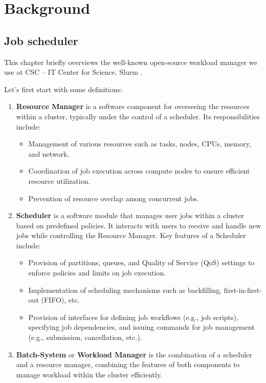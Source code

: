 \chapter{Background}
\label{chap:background}
\section{Job scheduler}
This chapter briefly overviews the well-known open-source workload manager we use at CSC -- IT Center for Science, Slurm \cite{10.1007/10968987_3}.

Let's first start with some definitions:

\begin{enumerate}
    \item \textbf{Resource Manager} is a software component for overseeing the resources within a cluster, typically under the control of a scheduler. Its responsibilities include:

    \begin{itemize}
        \item Management of various resources such as tasks, nodes, CPUs, memory, and network.
        \item Coordination of job execution across compute nodes to ensure efficient resource utilization.
        \item Prevention of resource overlap among concurrent jobs.
    \end{itemize}
    \item \textbf{Scheduler} is a software module that manages user jobs within a cluster based on predefined policies. It interacts with users to receive and handle new jobs while controlling the Resource Manager. Key features of a Scheduler include:

    \begin{itemize}
        \item Provision of partitions, queues, and Quality of Service (QoS) settings to enforce policies and limits on job execution.
        \item Implementation of scheduling mechanisms such as backfilling, first-in-first-out (FIFO), etc.
        \item Provision of interfaces for defining job workflows (e.g., job scripts), specifying job dependencies, and issuing commands for job management (e.g., submission, cancellation, etc.).
    \end{itemize}

    \item \textbf{Batch-System} or \textbf{Workload Manager} is the combination of a scheduler and a resource manager, combining the features of both components to manage workload within the cluster efficiently.
\end{enumerate}

